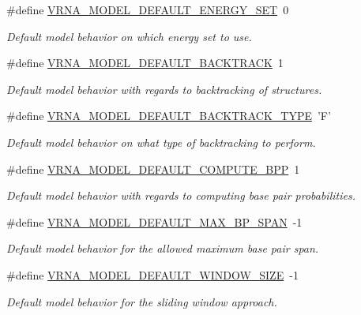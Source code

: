 \begin{DoxyCompactItemize}
\#define \hyperlink{group__model__details_ga6fcf6b2d0f89256cdbd166486c9b6e1e}{V\-R\-N\-A\-\_\-\-M\-O\-D\-E\-L\-\_\-\-D\-E\-F\-A\-U\-L\-T\-\_\-\-E\-N\-E\-R\-G\-Y\-\_\-\-S\-E\-T}~0
\begin{DoxyCompactList}\small\item\em Default model behavior on which energy set to use. \end{DoxyCompactList}\item 
\#define \hyperlink{group__model__details_ga3fda8006ab84baf817bd8e5ccbc6bb35}{V\-R\-N\-A\-\_\-\-M\-O\-D\-E\-L\-\_\-\-D\-E\-F\-A\-U\-L\-T\-\_\-\-B\-A\-C\-K\-T\-R\-A\-C\-K}~1
\begin{DoxyCompactList}\small\item\em Default model behavior with regards to backtracking of structures. \end{DoxyCompactList}\item 
\#define \hyperlink{group__model__details_gad0e81fcaca53c4a826c68e0796de2afb}{V\-R\-N\-A\-\_\-\-M\-O\-D\-E\-L\-\_\-\-D\-E\-F\-A\-U\-L\-T\-\_\-\-B\-A\-C\-K\-T\-R\-A\-C\-K\-\_\-\-T\-Y\-P\-E}~'F'
\begin{DoxyCompactList}\small\item\em Default model behavior on what type of backtracking to perform. \end{DoxyCompactList}\item 
\#define \hyperlink{group__model__details_ga1d6cd5051940b126c248147c011bac6c}{V\-R\-N\-A\-\_\-\-M\-O\-D\-E\-L\-\_\-\-D\-E\-F\-A\-U\-L\-T\-\_\-\-C\-O\-M\-P\-U\-T\-E\-\_\-\-B\-P\-P}~1
\begin{DoxyCompactList}\small\item\em Default model behavior with regards to computing base pair probabilities. \end{DoxyCompactList}\item 
\#define \hyperlink{group__model__details_ga7cb6f4ae8fdebff6746a4410814f2977}{V\-R\-N\-A\-\_\-\-M\-O\-D\-E\-L\-\_\-\-D\-E\-F\-A\-U\-L\-T\-\_\-\-M\-A\-X\-\_\-\-B\-P\-\_\-\-S\-P\-A\-N}~-\/1
\begin{DoxyCompactList}\small\item\em Default model behavior for the allowed maximum base pair span. \end{DoxyCompactList}\item 
\#define \hyperlink{group__model__details_ga8de04a9cb57e811e313b0f9f207f6bdb}{V\-R\-N\-A\-\_\-\-M\-O\-D\-E\-L\-\_\-\-D\-E\-F\-A\-U\-L\-T\-\_\-\-W\-I\-N\-D\-O\-W\-\_\-\-S\-I\-Z\-E}~-\/1
\begin{DoxyCompactList}\small\item\em Default model behavior for the sliding window approach. \end{DoxyCompactList}\item 

\end{DoxyCompactItemize}
